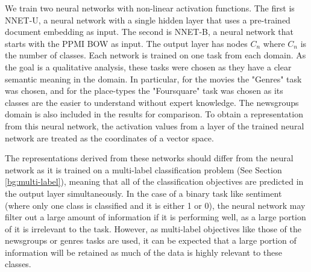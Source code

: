 We train two neural networks with non-linear activation functions. The first is NNET-U, a neural network with a single hidden layer that uses a pre-trained document embedding as input. The second is NNET-B, a neural network that starts with the PPMI BOW as input. The output layer has nodes $C_n$ where $C_n$ is the number of classes. Each network is trained on one task from each domain. As the goal is a qualitative analysis, these tasks were chosen as they have a clear semantic meaning in the domain. In particular, for the movies the "Genres" task was chosen, and for the place-types the "Foursquare" task was chosen as its classes are the easier to understand without expert knowledge. The newsgroups domain is also included in the results for comparison. To obtain a representation from this neural network, the activation values from a layer of the trained neural network are treated as the coordinates of a vector space.

The representations derived from these networks should differ from the  neural network as it is trained on a multi-label classification problem (See Section \ref{bg:multi-label}), meaning that all of the classification objectives are predicted in the output layer simultaneously. In the case of a binary task like sentiment (where only one class is classified and it is either 1 or 0),  the neural network may filter out a large amount of information if it is performing well, as a large portion of it is irrelevant to the task. However, as multi-label objectives like those of the newsgroups or genres tasks are used, it can be expected that a large portion of information will be retained as much of the data is highly relevant to these classes. 


